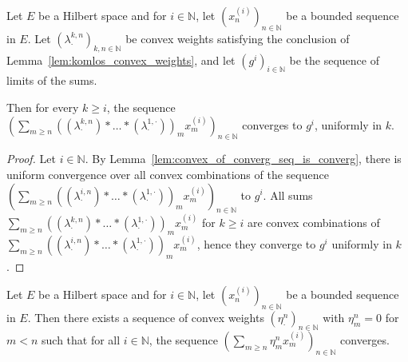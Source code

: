 \begin{lemma}\label{lem:komlos_convex_weights_tendsto}
  \leanok
Let $E$ be a Hilbert space and for $i \in \mathbb{N}$, let $(x_n^{(i)})_{n \in \mathbb{N}}$ be a bounded sequence in $E$.
Let $(\lambda^{k,n}_\cdot)_{k, n \in \mathbb{N}}$ be convex weights satisfying the conclusion of Lemma~\ref{lem:komlos_convex_weights}, and let $(g^i)_{i\in \mathbb{N}}$ be the sequence of limits of the sums.

Then for every $k \ge i$, the sequence $\left(\sum_{m \ge n} \left((\lambda^{k,n}_\cdot) * \ldots * (\lambda^{1,\cdot}_\cdot)\right)_m x_m^{(i)}\right)_{n \in \mathbb{N}}$ converges to $g^i$, uniformly in $k$.
\end{lemma}

\begin{proof}  
Let $i \in \mathbb{N}$.
By Lemma~\ref{lem:convex_of_converg_seq_is_converg}, there is uniform convergence over all convex combinations of the sequence $\left(\sum_{m \ge n} \left((\lambda^{i,n}_\cdot) * \ldots * (\lambda^{1,\cdot}_\cdot)\right)_m x_m^{(i)}\right)_{n \in \mathbb{N}}$ to $g^i$.
All sums $\sum_{m \ge n} \left((\lambda^{k,n}_\cdot) * \ldots * (\lambda^{1,\cdot}_\cdot)\right)_m x_m^{(i)}$ for $k \ge i$ are convex combinations of $\sum_{m \ge n} \left((\lambda^{i,n}_\cdot) * \ldots * (\lambda^{1,\cdot}_\cdot)\right)_m x_m^{(i)}$, hence they converge to $g^i$ uniformly in $k$.
\end{proof}


\begin{lemma}\label{lem:komlos_convex_weights_diagonal}
  \leanok
Let $E$ be a Hilbert space and for $i \in \mathbb{N}$, let $(x_n^{(i)})_{n \in \mathbb{N}}$ be a bounded sequence in $E$.
Then there exists a sequence of convex weights $(\eta^n_\cdot)_{n \in \mathbb{N}}$ with $\eta^n_m = 0$ for $m < n$ such that for all $i \in \mathbb{N}$, the sequence $\left(\sum_{m \ge n} \eta^n_m x_m^{(i)}\right)_{n \in \mathbb{N}}$ converges.
\end{lemma}

